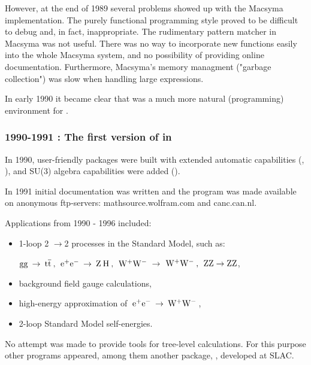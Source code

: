 However, at the end of 1989 several problems showed up with the Macsyma implementation. The purely functional programming style proved to be difficult to debug and, in fact, inappropriate. The rudimentary pattern matcher in Macsyma was not useful. There was no way to incorporate new functions easily into the whole Macsyma system, and no possibility of providing online documentation. Furthermore, Macsyma's memory managment ("garbage collection") was slow when handling large expressions.

In early 1990 it became clear that \mma was a much more natural (programming) environment for \fc.

\subsubsection*{1990-1991 : The first version  of \fc in \mma}

In 1990, user-friendly  packages were built with extended automatic capabilities (, ), and SU(3) algebra capabilities were added ().

In 1991 initial documentation was written and the program was made available on anonymous ftp-servers: mathsource.wolfram.com and canc.can.nl.

Applications from 1990 - 1996  included:

\begin{itemize}

\item 1-loop 2 \(\rightarrow \)2 processes in the Standard
Model, such as:

\({\rm gg}\> \rightarrow \> 
{\rm t \overline{t}} \> , \> \>
{{\rm e}^+}{{\rm e}^-}\> \rightarrow \> {\rm Z}\> {\rm H}\>, \> \>
{{\rm W}^+}{{\rm W}^-}\> \)\(\rightarrow \) \({{\rm W}^+}{{\rm W}^-}\>, \> \>
{\rm ZZ} \rightarrow {\rm ZZ} \),

\item background field gauge calculations,

\item high-energy approximation of \(\>{{\rm e}^+}
{{\rm e}^-}\> \rightarrow \> {{\rm W}^+}{{\rm W}^-}\> \),

\item  2-loop Standard Model self-energies.

\end{itemize}

No attempt was made to provide tools for tree-level calculations. For this purpose other programs appeared, among them another  \mma package, \hip \cite{yeh}, developed at SLAC.

